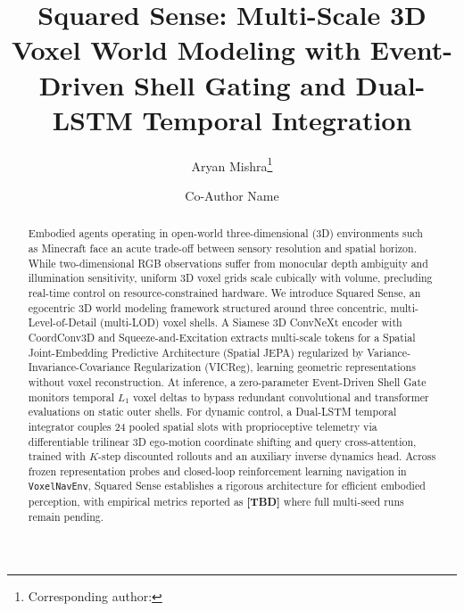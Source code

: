 \documentclass[runningheads]{llncs}
\begin{document}
\title{Squared Sense: Multi-Scale 3D Voxel World Modeling with Event-Driven Shell Gating and Dual-LSTM Temporal Integration}


\author{Aryan Mishra\thanks{Corresponding author: } \and Co-Author Name}



\maketitle

\begin{abstract}
Embodied agents operating in open-world three-dimensional (3D) environments such as Minecraft face an acute trade-off between sensory resolution and spatial horizon. While two-dimensional RGB observations suffer from monocular depth ambiguity and illumination sensitivity, uniform 3D voxel grids scale cubically with volume, precluding real-time control on resource-constrained hardware. We introduce Squared Sense, an egocentric 3D world modeling framework structured around three concentric, multi-Level-of-Detail (multi-LOD) voxel shells. A Siamese 3D ConvNeXt encoder with CoordConv3D and Squeeze-and-Excitation extracts multi-scale tokens for a Spatial Joint-Embedding Predictive Architecture (Spatial JEPA) regularized by Variance-Invariance-Covariance Regularization (VICReg), learning geometric representations without voxel reconstruction. At inference, a zero-parameter Event-Driven Shell Gate monitors temporal $L_1$ voxel deltas to bypass redundant convolutional and transformer evaluations on static outer shells. For dynamic control, a Dual-LSTM temporal integrator couples 24 pooled spatial slots with proprioceptive telemetry via differentiable trilinear 3D ego-motion coordinate shifting and query cross-attention, trained with $K$-step discounted rollouts and an auxiliary inverse dynamics head. Across frozen representation probes and closed-loop reinforcement learning navigation in \texttt{VoxelNavEnv}, Squared Sense establishes a rigorous architecture for efficient embodied perception, with empirical metrics reported as \textbf{[TBD]} where full multi-seed runs remain pending.
\end{abstract}
\end{document}
